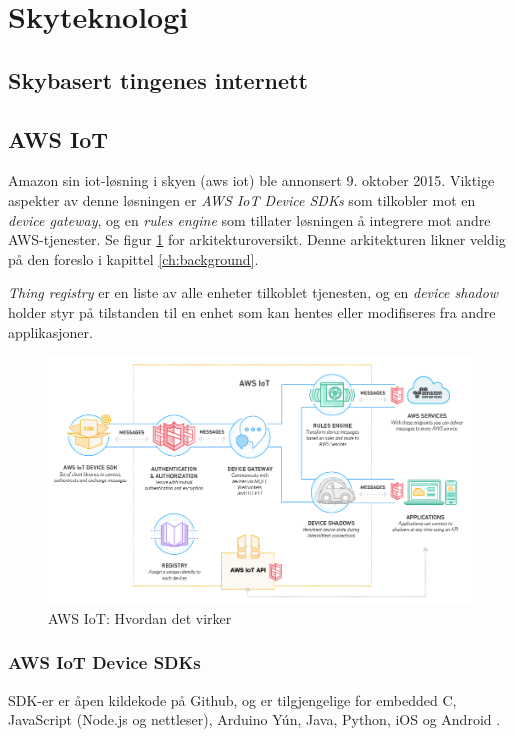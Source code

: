 \section{Skyteknologi}
\blindtext

\subsection{Skybasert tingenes internett}
\blindtext

\subsection{AWS IoT}
Amazon sin \gls{iot}-løsning i skyen (\gls{aws} \gls{iot}) ble annonsert 9. oktober 2015.
Viktige aspekter av denne løsningen er \textit{AWS IoT Device SDKs} som tilkobler mot 
en \textit{device gateway}, og en \textit{rules engine} som tillater løsningen å integrere
mot andre AWS-tjenester. Se figur \ref{fig:awsiot_how} for arkitekturoversikt.
Denne arkitekturen likner veldig på den \citet{iot_harvard_smart} foreslo i kapittel \ref{ch:background}.

\textit{Thing registry} er en liste av alle enheter tilkoblet tjenesten, og en \textit{device shadow}
holder styr på tilstanden til en enhet som kan hentes eller modifiseres fra andre applikasjoner.

\begin{figure}
\includegraphics[width=1.0\textwidth,center]{fig/awsiot_how}
\caption{AWS IoT: Hvordan det virker \citep{aws_works}}
\label{fig:awsiot_how}
\end{figure}

\subsubsection{AWS IoT Device SDKs}
SDK-er er åpen kildekode på Github, og er tilgjengelige for embedded C, JavaScript (Node.js og nettleser),
Arduino Yún, Java, Python, iOS og Android \citep{aws_sdks}.

